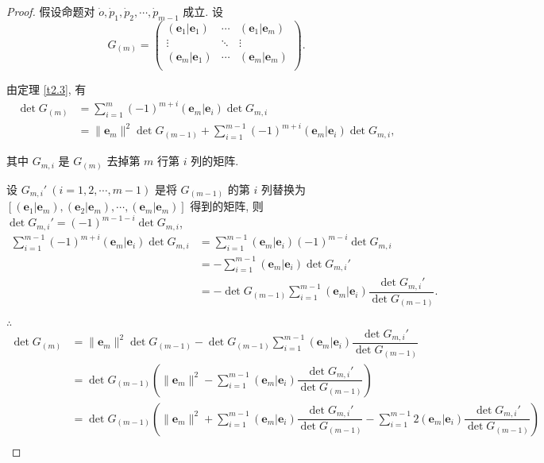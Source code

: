 \documentclass{ctexart}
\begin{document}
\begin{proof}
    假设命题对 $\dot{o},\dot{p}_1,\dot{p}_2,\cdots,\dot{p}_{m-1}$ 成立. 设
    \[G_{(m)}=\begin{pmatrix}
        (\boldsymbol{e}_1|\boldsymbol{e}_1) & \cdots & (\boldsymbol{e}_1|\boldsymbol{e}_m) \\
        \vdots & \ddots & \vdots \\
        (\boldsymbol{e}_m|\boldsymbol{e}_1) & \cdots & (\boldsymbol{e}_m|\boldsymbol{e}_m) \\
    \end{pmatrix}.\]
    
    由定理 \ref{t2.3}, 有
    \begin{align*}
        \det G_{(m)} & =\sum\limits_{i=1}^m(-1)^{m+i}(\boldsymbol{e}_m|\boldsymbol{e}_i)\det G_{m,i} \\
        & =\|\boldsymbol{e}_m\|^2\det G_{(m-1)}+\sum\limits_{i=1}^{m-1}(-1)^{m+i}(\boldsymbol{e}_m|\boldsymbol{e}_i)\det G_{m,i},
    \end{align*}

    其中 $G_{m,i}$ 是 $G_{(m)}$ 去掉第 $m$ 行第 $i$ 列的矩阵.
    
    设 $G_{m,i}'\ (i=1,2,\cdots,m-1)$ 是将 $G_{(m-1)}$ 的第 $i$ 列替换为 $[(\boldsymbol{e}_1|\boldsymbol{e}_m),(\boldsymbol{e}_2|\boldsymbol{e}_m),\cdots,(\boldsymbol{e}_m|\boldsymbol{e}_m)]$ 得到的矩阵, 则 $\det G_{m,i}'=(-1)^{m-1-i}\det G_{m,i}$,
    \begin{align*}
        \sum\limits_{i=1}^{m-1}(-1)^{m+i}(\boldsymbol{e}_m|\boldsymbol{e}_i)\det G_{m,i} & =\sum\limits_{i=1}^{m-1}(\boldsymbol{e}_m|\boldsymbol{e}_i)(-1)^{m-i}\det G_{m,i} \\
        & =-\sum\limits_{i=1}^{m-1}(\boldsymbol{e}_m|\boldsymbol{e}_i)\det G_{m,i}' \\
        & =-\det G_{(m-1)}\sum\limits_{i=1}^{m-1}(\boldsymbol{e}_m|\boldsymbol{e}_i)\dfrac{\det G_{m,i}'}{\det G_{(m-1)}}.
    \end{align*}

    $\therefore$
    \begin{align*}
        \det G_{(m)} & =\|\boldsymbol{e}_m\|^2\det G_{(m-1)}-\det G_{(m-1)}\sum\limits_{i=1}^{m-1}(\boldsymbol{e}_m|\boldsymbol{e}_i)\dfrac{\det G_{m,i}'}{\det G_{(m-1)}} \\
        & =\det G_{(m-1)}\left(\|\boldsymbol{e}_m\|^2-\sum\limits_{i=1}^{m-1}(\boldsymbol{e}_m|\boldsymbol{e}_i)\dfrac{\det G_{m,i}'}{\det G_{(m-1)}}\right) \\
        & =\det G_{(m-1)}\left(\|\boldsymbol{e}_m\|^2+\sum\limits_{i=1}^{m-1}(\boldsymbol{e}_m|\boldsymbol{e}_i)\dfrac{\det G_{m,i}'}{\det G_{(m-1)}}-\sum\limits_{i=1}^{m-1}2(\boldsymbol{e}_m|\boldsymbol{e}_i)\dfrac{\det G_{m,i}'}{\det G_{(m-1)}}\right) \\
    \end{align*}
\end{proof}
\end{document}
